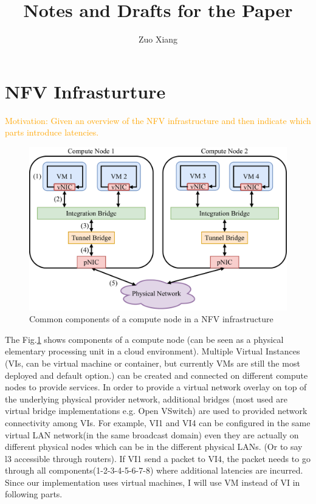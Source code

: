 \documentclass[12pt]{article}
\title{
    Notes and Drafts for the Paper
}
\author{
    Zuo Xiang
}
\newcommand{\orange}[1]{\textcolor{orange}{Motivation: #1}}
\begin{document}
\maketitle

\section{NFV Infrasturture}%
\label{sec:nfv_infrasturture}

\orange{Given an overview of the NFV infrastructure and then indicate which parts introduce latencies.}

\begin{figure}[htpb]
    \centering
    \includegraphics[width=0.8\linewidth]{./figures/nfv_infra.pdf}
    \caption{Common components of a compute node in a NFV infrastructure}
    \label{fig:nfv_infra}
\end{figure}

The Fig.\ref{fig:nfv_infra} shows components of a compute node (can be seen as a physical elementary processing unit in
a cloud environment). Multiple Virtual Instances (VIs, can be virtual machine or container, but currently VMs are still
the most deployed and default option.) can be created and connected on different compute nodes to provide services. In
order to provide a virtual network overlay on top of the underlying physical provider network, additional bridges (most
used are virtual bridge implementations e.g. Open VSwitch) are used to provided network connectivity among VIs. For
example, VI1 and VI4 can be configured in the same virtual LAN network(in the same broadcast domain) even they are
actually on different physical nodes which can be in the different physical LANs. (Or to say l3 accessible through
routers). If VI1 send a packet to VI4, the packet needs to go through all components(1-2-3-4-5-6-7-8) where additional
latencies are incurred. Since our implementation uses virtual machines, I will use VM instead of VI in following parts.
\end{document}
